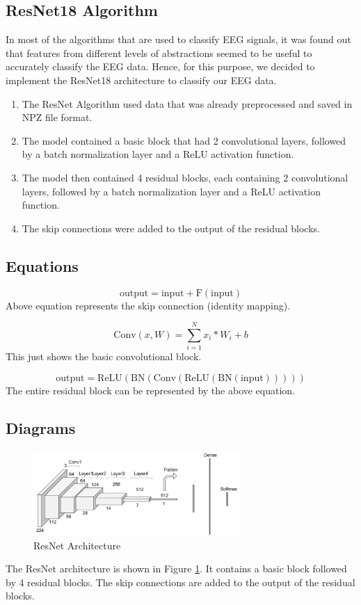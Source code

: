 \documentclass[10pt]{article}
\begin{document}
\subsection{ResNet18 Algorithm}
In most of the algorithms that are used to classify EEG signals, it was found out that features from different levels of abstractions seemed to be useful to accurately classify the EEG data. Hence, for this purpose, we decided to implement the ResNet18 architecture to classify our EEG data.
\begin{enumerate}
    \item The ResNet Algorithm used data that was already preprocessed and saved in NPZ file format.
    \item The model contained a basic block that had 2 convolutional layers, followed by a batch normalization layer and a ReLU activation function.
    \item The model then contained 4 residual blocks, each containing 2 convolutional layers, followed by a batch normalization layer and a ReLU activation function.
    \item The skip connections were added to the output of the residual blocks.
\end{enumerate}

\subsection{Equations}
\[
\text{output} = \text{input} + \text{F}(\text{input})
\]
Above equation represents the skip connection (identity mapping).

\[
\text{Conv}(x, W) = \sum_{i=1}^{N} x_i \ast W_i + b
\]
This just shows the basic convolutional block.

\[
\text{output} = \text{ReLU}(\text{BN}(\text{Conv}(\text{ReLU}(\text{BN}(\text{input})))))
\]
The entire residual block can be represented by the above equation.

\subsection{Diagrams}
\begin{figure}[H]
    \centering
    \includegraphics[width=0.7\textwidth]{resnet.png}
    \caption{ResNet Architecture}
    \label{fig:resnet_arch}
\end{figure}
The ResNet architecture is shown in Figure \ref{fig:resnet_arch}. It contains a basic block followed by 4 residual blocks. The skip connections are added to the output of the residual blocks.
\end{document}
